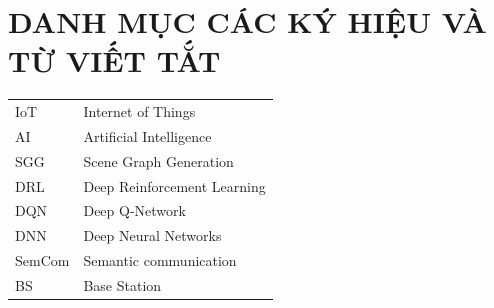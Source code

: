 \section*{DANH MỤC CÁC KÝ HIỆU VÀ TỪ VIẾT TẮT}
 {}

\begin{tabular}{ l l }
\hspace{1cm} IoT & \hspace{4cm} Internet of Things \\  
\hspace{1cm} AI & \hspace{4cm} Artificial Intelligence \\  
\hspace{1cm} SGG & \hspace{4cm} Scene Graph Generation \\   
\hspace{1cm} DRL & \hspace{4cm} Deep Reinforcement Learning \\  
\hspace{1cm} DQN & \hspace{4cm} Deep Q-Network \\   
\hspace{1cm}  DNN  & \hspace{4cm}  Deep Neural Networks \\ 
\hspace{1cm}  SemCom  & \hspace{4cm}  Semantic communication \\ 
\hspace{1cm}  BS  & \hspace{4cm}  Base Station \\ 
\end{tabular}  

\newpage
